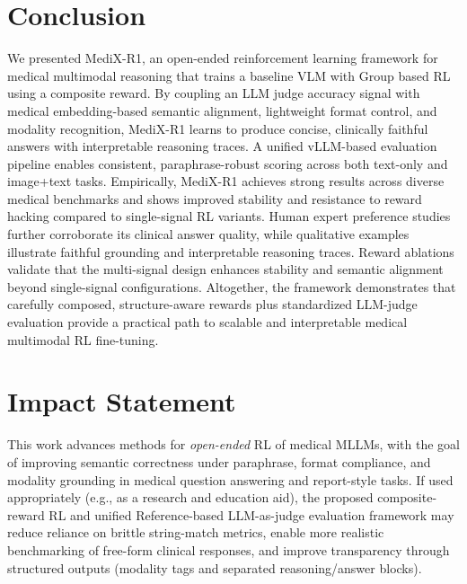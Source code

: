 \documentclass{article}
\theoremstyle{plain}
\theoremstyle{definition}
\theoremstyle{remark}
\begin{document}
\section{Conclusion}
We presented MediX-R1, an open-ended reinforcement learning framework for medical multimodal reasoning that trains a baseline VLM with Group based RL using a composite reward. By coupling an LLM judge accuracy signal with medical embedding-based semantic alignment, lightweight format control, and modality recognition, MediX-R1 learns to produce concise, clinically faithful answers with interpretable reasoning traces. A unified vLLM-based evaluation pipeline enables consistent, paraphrase-robust scoring across both text-only and image+text tasks. Empirically, MediX-R1 achieves strong results across diverse medical benchmarks and shows improved stability and resistance to reward hacking compared to single-signal RL variants. Human expert preference studies further corroborate its clinical answer quality, while qualitative examples illustrate faithful grounding and interpretable reasoning traces. Reward ablations validate that the multi-signal design enhances stability and semantic alignment beyond single-signal configurations. Altogether, the framework demonstrates that carefully composed, structure-aware rewards plus standardized LLM-judge evaluation provide a practical path to scalable and interpretable medical multimodal RL fine-tuning.

\section*{Impact Statement}
This work advances methods for \emph{open-ended} RL of medical MLLMs, with the goal of improving semantic correctness under paraphrase, format compliance, and modality grounding in medical question answering and report-style tasks. If used appropriately (e.g., as a research and education aid), the proposed composite-reward RL and unified Reference-based LLM-as-judge evaluation framework may reduce reliance on brittle string-match metrics, enable more realistic benchmarking of free-form clinical responses, and improve transparency through structured outputs (modality tags and separated reasoning/answer blocks).
\end{document}

